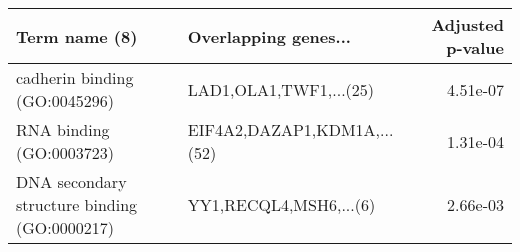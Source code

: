 \begin{tabular}{llr}
\toprule
                               Term name (8) &        Overlapping genes... &  Adjusted p-value \\
\midrule
               cadherin binding (GO:0045296) &      LAD1,OLA1,TWF1,...(25) &          4.51e-07 \\
                    RNA binding (GO:0003723) & EIF4A2,DAZAP1,KDM1A,...(52) &          1.31e-04 \\
DNA secondary structure binding (GO:0000217) &      YY1,RECQL4,MSH6,...(6) &          2.66e-03 \\
\bottomrule
\end{tabular}
